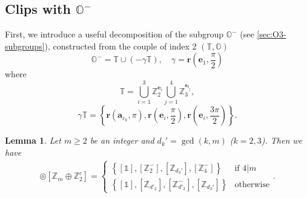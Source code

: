 \documentclass[11pt,a4paper]{amsart}
\newtheorem{lem}[thm]{Lemma}
\theoremstyle{definition}
\newcommand{\ZZ}{\mathbb{Z}}                %
\newcommand{\octa}{\mathbb{O}}              %
\newcommand{\tetra}{\mathbb{T}}             %
\newcommand{\1}{\mathds{1}}		            %
\newcommand{\ee}{\pmb{e}}                   %
\newcommand{\vR}{\mathbf{r}}
\newcommand{\bs}{\mathbf{s}}
\newcommand{\set}[1]{\left\{#1\right\}}     %
\begin{document}

\subsection{Clips with $\octa^-$}

First, we introduce a useful decomposition of the subgroup $\octa^-$ (see \autoref{sec:O3-subgroups}), constructed from the couple of index 2 $(\tetra,\octa)$
\begin{equation*}
	\octa^-=\tetra \cup (-\gamma\tetra),\quad \gamma=\vR\left(\ee_1,\frac{\pi}{2}\right)
\end{equation*}
where
\begin{equation}
	\tetra=\bigcup_{i=1}^3\ZZ_2^{\ee_i}\bigcup_{j=1}^4 \ZZ_3^{\pmb{s}_{t_j}},
\end{equation}
\begin{equation}\label{eq:gammaT}
	\gamma\tetra=\set{\vR\left(\pmb{a}_{c_k},\pi\right),\vR\left(\ee_i,\frac{\pi}{2}\right),\vR\left(\ee_i,\frac{3\pi}{2}\right)}.
\end{equation}


\begin{lem}\label{lem:octaclipsZm}
  Let $m\geq 2$ be an integer and $d_k'=\gcd(k,m)$ ($k=2,3$). Then we have
  \begin{align*}
    [\octa^-] \circledcirc [\ZZ_m \oplus \ZZ_2^c]=
    \begin{cases}
      \set{[\1],[\ZZ_{2}^-],[\ZZ_{d_3'}],[\ZZ_4^-]}       & \text{if $4|m$}  \\
      \set{[\1],[\ZZ_{d'_2}],[\ZZ_{d'_2}^-],[\ZZ_{d_3'}]} & \text{otherwise}
    \end{cases}.
  \end{align*}
\end{lem}
\end{document}
